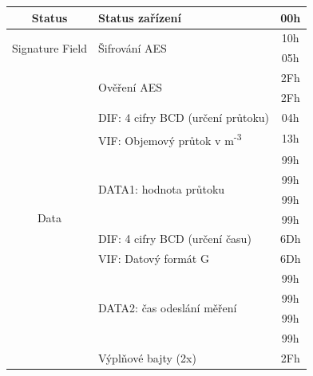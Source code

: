 \begin{table}[!ht]
{\begin{tabular}{|c|l|c|}
Status             & Status zařízení                                & 00h              \\ \hline
\multirow{2}{*}{Signature Field} & \multirow{2}{*}{Šifrování AES} & 10h              \\ \cline{3-3}
									&                        													& 05h              \\ \hline
\multirow{15}{*}{Data} 						   & \multirow{2}{*}{Ověření AES}                  & 2Fh              \\ \cline{3-3}
						   &                                     						& 2Fh              \\ \cline{2-3}
               & DIF: 4 cifry BCD (určení průtoku)      & 04h              \\ \cline{2-3}
               & VIF: Objemový průtok v m\textsuperscript{-3} & 13h         \\ \cline{2-3}
              & \multirow{4}{*}{DATA1: hodnota průtoku}            & 99h               \\ \cline{3-3}
               &                               											& 99h               \\  \cline{3-3}
               &                               											& 99h               \\   \cline{3-3}
              &                               											& 99h               \\ \cline{2-3}
               & DIF: 4 cifry BCD (určení času)         & 6Dh              \\ \cline{2-3}
               & VIF: Datový formát G                               & 6Dh              \\ \cline{2-3}
               & \multirow{4}{*}{DATA2: čas odeslání měření}   & 99h               \\  \cline{3-3}
              &                           												& 99h               \\  \cline{3-3}
               &                           												& 99h               \\  \cline{3-3}
               &                            											& 99h               \\ \cline{2-3}
						   & Výplňové bajty (2x)                                  & 2Fh              \\  \hline \hline
\end{tabular}}
\end{table}

\newpage{}

